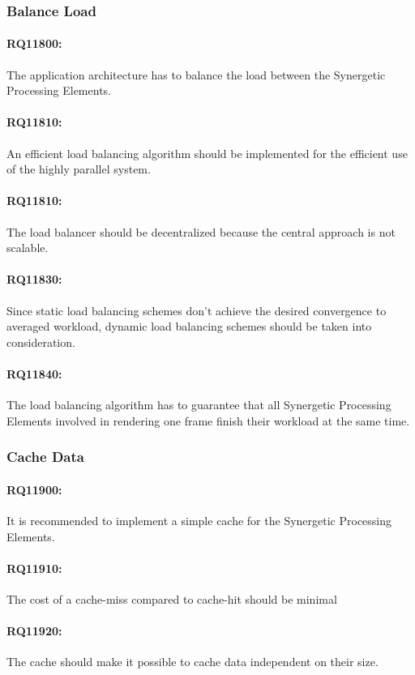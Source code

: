 \documentclass[DIV10, abstracton, openright, footsepline, headsepline, twoside, 9pt,
bigheadings]{scrreprt}
\begin{document}
\subsubsection{Balance Load}
\paragraph{RQ11800:} The application architecture has to balance the load between
the Synergetic Processing Elements.
\paragraph{RQ11810:} An efficient load balancing algorithm should be implemented for
the efficient use of the highly parallel system.
\paragraph{RQ11810:} The load balancer
should be decentralized because the central approach is not scalable.
\paragraph{RQ11830:} Since static load balancing schemes don't achieve the desired
convergence to averaged workload, dynamic load balancing schemes should be taken
into consideration.
\paragraph{RQ11840:} The load balancing algorithm has to guarantee that all
Synergetic Processing Elements involved in rendering one frame finish their workload
at the same time.

\subsubsection{Cache Data}
\paragraph{RQ11900:} It is recommended to implement a simple cache for the Synergetic
Processing Elements.
\paragraph{RQ11910:} The cost of a cache-miss compared to cache-hit should be
minimal
\paragraph{RQ11920:} The cache should make it possible to cache data independent on
their size.
\end{document}
